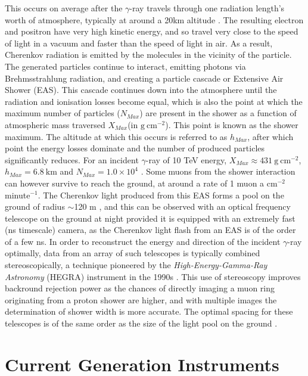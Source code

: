 This occurs on average after the $\gamma$-ray travels through one radiation length's worth of atmosphere, typically at around a 20km altitude \cite{weekesgamma}. The resulting electron and positron have very high kinetic energy, and so travel very close to the speed of light in a vacuum and faster than the speed of light in air. As a result, Cherenkov radiation is emitted by the molecules in the vicinity of the particle.
The generated particles continue to interact, emitting photons via Brehmsstrahlung radiation, and creating a particle cascade or Extensive Air Shower (EAS). This cascade continues down into the atmosphere until the radiation and ionisation losses become equal, which is also the point at which the maximum number of particles ($N_{Max}$) are present in the shower as a function of atmospheric mass traversed $X_{Max}$(in $\mathrm{g\ cm^{-2}}$). This point is known as the shower maximum. The altitude at which this occurs is referred to as $h_{Max}$, after which point the energy losses dominate and the number of produced particles significantly reduces. For an incident $\gamma$-ray of 10 TeV energy, $X_{Max}\approx 431 \mathrm{\ g\ cm^{-2}}$, $h_{Max}=6.8\ \mathrm{km}$ and $N_{Max}=1.0 \times 10^4$ \cite{weekesgamma}. Some muons from the shower interaction can however survive to reach the ground, at around a rate of 1 muon a $\mathrm{cm^{-2}}$ minute$^{-1}$. The Cherenkov light produced from this EAS forms a pool on the ground of radius $\sim$120 m \cite{weekesgamma}, and this can be observed with an optical frequency telescope on the ground at night provided it is equipped with an extremely fast (ns timescale) camera, as the Cherenkov light flash from an EAS is of the order of a few ns. In order to reconstruct the energy and direction of the incident $\gamma$-ray optimally, data from an array of such telescopes is typically combined stereoscopically, a technique pioneered by the \textit{High-Energy-Gamma-Ray Astronomy} (HEGRA) instrument in the 1990s \cite{HEGRA}. This use of stereoscopy improves backround rejection power as the chances of directly imaging a muon ring originating from a proton shower are higher, and with multiple images the determination of shower width is more accurate.  The optimal spacing for these telescopes is of the same order as the size of the light pool on the ground \cite{weekesgamma}.
\section{Current Generation Instruments}
